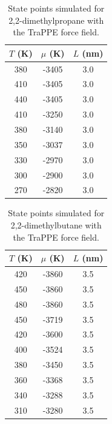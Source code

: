 \documentclass[journal=jctc,manuscript=article]{achemso}
\begin{document}
\begin{table}[htb!]
	\caption{State points simulated for 2,2-dimethylpropane with the TraPPE force field.}
	\begin{center}
		\begin{tabular}{|c|c|c|}
			\hline
			$T$ (K) & $\mu$ (K) & $L$ (nm) \\ \hline
			380	&	-3405	&	3.0	\\
			410	&	-3405	&	3.0	\\
			440	&	-3405	&	3.0	\\
			410	&	-3250	&	3.0	\\
			380	&	-3140	&	3.0	\\
			350	&	-3037	&	3.0	\\
			330	&	-2970	&	3.0	\\
			300	&	-2900	&	3.0	\\
			270	&	-2820	&	3.0	\\
			\hline
		\end{tabular}
	\end{center}
\end{table}

\begin{table}[htb!]
	\caption{State points simulated for 2,2-dimethylbutane with the TraPPE force field.}
	\begin{center}
		\begin{tabular}{|c|c|c|}
			\hline
			$T$ (K) & $\mu$ (K) & $L$ (nm) \\ \hline
			420	&	-3860	&	3.5	\\
			450	&	-3860	&	3.5	\\
			480	&	-3860	&	3.5	\\
			450	&	-3719	&	3.5	\\
			420	&	-3600	&	3.5	\\
			400	&	-3524	&	3.5	\\
			380	&	-3450	&	3.5	\\
			360	&	-3368	&	3.5	\\
			340	&	-3288	&	3.5	\\
			310	&	-3280	&	3.5	\\
			\hline
		\end{tabular}
	\end{center}
\end{table}
\end{document}

